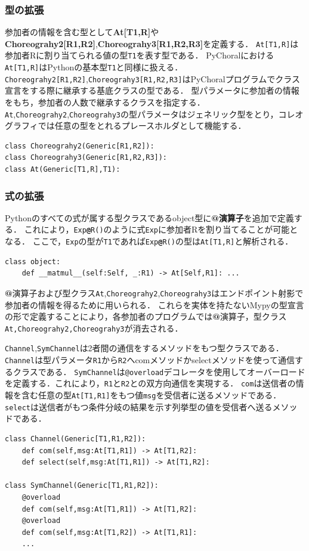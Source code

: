 \documentclass{thesis}
\newcommand{\mblue}[1]{\textbf{\textsf{\color{MidnightBlue}#1}}}
\begin{document}
\subsubsection*{型の拡張}
参加者の情報を含む型として\textbf{At[T1,R]}や\textbf{Choreograhy2[R1,R2]},\textbf{Choreograhy3[R1,R2,R3]}を定義する．
\texttt{At[T1,R]}は参加者Rに割り当てられる値の型\texttt{T1}を表す型である．
PyChoralにおける\texttt{At[T1,R]}はPythonの基本型\texttt{T1}と同様に扱える．
\texttt{Choreograhy2[R1,R2]},\texttt{Choreograhy3[R1,R2,R3]}はPyChoralプログラムでクラス宣言をする際に継承する基底クラスの型である．
型パラメータに参加者の情報をもち，参加者の人数で継承するクラスを指定する．
\texttt{At},\texttt{Choreograhy2},\texttt{Choreograhy3}の型パラメータはジェネリック型をとり，コレオグラフィでは任意の型をとれるプレースホルダとして機能する．
\begin{lstlisting}[frame = none, numbers = none]
class Choreograhy2(Generic[R1,R2]):
class Choreograhy3(Generic[R1,R2,R3]):
class At(Generic[T1,R],T1):
\end{lstlisting}

\subsubsection*{式の拡張}
Pythonのすべての式が属する型クラスである\textsf{object}型に\textbf{\mblue{@}演算子}を追加で定義する．
これにより，\texttt{Exp\mblue{@}R()}のように式\texttt{Exp}に参加者Rを割り当てることが可能となる．
ここで，\texttt{Exp}の型が\texttt{T1}であれば\texttt{Exp\mblue{@}R()}の型は\texttt{At[T1,R]}と解析される．
\begin{lstlisting}[frame =none,numbers = none]
class object:
    def __matmul__(self:Self, _:R1) -> At[Self,R1]: ...
\end{lstlisting}
\mblue{@}演算子および型クラス\texttt{At},\texttt{Choreograhy2},\texttt{Choreograhy3}はエンドポイント射影で参加者の情報を得るために用いられる．
これらを実体を持たないMypyの型宣言の形で定義することにより，各参加者のプログラムでは\mblue{@}演算子，型クラス\texttt{At,Choreograhy2,Choreograhy3}が消去される．%

\texttt{Channel},\texttt{SymChannel}は2者間の通信をするメソッドをもつ型クラスである．
\texttt{Channel}は型パラメータ\texttt{R1}から\texttt{R2}へ\textsf{com}メソッドか\textsf{select}メソッドを使って通信するクラスである．
\texttt{SymChannel}は\texttt{@overload}デコレータを使用してオーバーロードを定義する．これにより，\texttt{R1}と\texttt{R2}との双方向通信を実現する．
\texttt{com}は送信者の情報を含む任意の型\texttt{At[T1,R1]}をもつ値\texttt{msg}を受信者に送るメソッドである．
\texttt{select}は送信者がもつ条件分岐の結果を示す列挙型の値を受信者へ送るメソッドである．
\begin{lstlisting}[numbers = none]
class Channel(Generic[T1,R1,R2]):
    def com(self,msg:At[T1,R1]) -> At[T1,R2]:
    def select(self,msg:At[T1,R1]) -> At[T1,R2]:

class SymChannel(Generic[T1,R1,R2]):
    @overload
    def com(self,msg:At[T1,R1]) -> At[T1,R2]:
    @overload
    def com(self,msg:At[T1,R2]) -> At[T1,R1]:
    ... 
\end{lstlisting}
\end{document}
